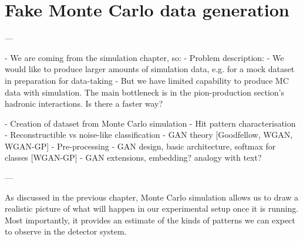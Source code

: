 \chapter{Fake Monte Carlo data generation}
\begin{markdown}
---

- We are coming from the simulation chapter, so:
- Problem description: 
 - We would like to produce larger amounts of simulation data, e.g. for a mock dataset in preparation for data-taking
 - But we have limited capability to produce MC data with simulation. The main bottleneck is in the pion-production section's hadronic interactions. Is there a faster way?


- Creation of dataset from Monte Carlo simulation
  - Hit pattern characterisation
  - Reconstructible vs noise-like classification
- GAN theory [Goodfellow, WGAN, WGAN-GP]
 - Pre-processing
- GAN design, basic architecture, softmax for classes [WGAN-GP]
- GAN extensions, embedding? analogy with text?

---
\end{markdown}


As discussed in the previous chapter, Monte Carlo simulation allows us to draw a realistic picture of what will happen in our experimental setup once it is running. Most importantly, it provides an estimate of the kinds of patterns we can expect to observe in the detector system. 

